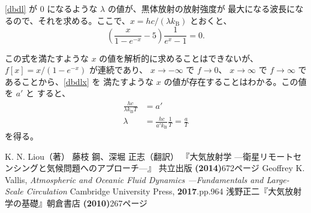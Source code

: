 \documentclass[book]{dennou777}
\begin{document}
\eqref{dbdl} が \(0\) になるような \(\lambda\) の値が、黒体放射の放射強度が
最大になる波長になるので、それを求める。ここで、\(x=hc/(\lambda k_\mathrm{B})\) とおくと、
\begin{equation}
	\left(\frac{x}{1-e^{-x}}-5\right)\frac{1}{e^x-1}=0.\label{dbdlx}
\end{equation}

この式を満たすような \(x\) の値を解析的に求めることはできないが、
\(f[x]=x/(1-e^{-x})\) が連続であり、 \(x\to-\infty\) で \(f\to0\)、
\(x\to\infty\) で \(f\to\infty\) であることから、\eqref{dbdlx} を
満たすような \(x\) の値が存在することはわかる。この値を \(a'\) と
すると、
\begin{align}
	\frac{hc}{\lambda k_\mathrm{B}T}&=a'\\
	\lambda&=\frac{hc}{a'k_\mathrm{B}}\frac{1}{T}=\frac{a}{T}
\end{align}
を得る。

\clearpage
\begin{thebibliography}{9}
	 K. N. Liou（著） 藤枝 鋼、深堀 正志（翻訳）
	『大気放射学 ---衛星リモートセンシングと気候問題へのアプローチ---』
	共立出版 \textbf{(2014)}\quad672ページ
	 Geoffrey K. Vallis,
	\textit{Atmospheric and Oceanic Fluid Dynamics ---Fundamentals and Large-Scale Circulation}
	Cambridge University Press, \textbf{2017}.\quad pp.964
	 浅野正二『大気放射学の基礎』朝倉書店 \textbf{(2010)}\quad267ページ
\end{thebibliography}

\pagebreak
\listoffigures
\listoftables
\end{document}

